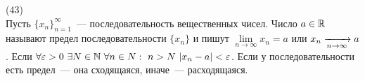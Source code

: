 (43)\\
Пусть $\{x_n\}^{\infty}_{n = 1}$~--- последовательность вещественных чисел. Число $a \in \mathbb{R}$ называют предел последовательности $\{x_n\}$ и пишут $\lim\limits_{n\to \infty} x_n = a$ или $x_n \xrightarrow[n \to \infty]{} a$. Если $\forall \varepsilon > 0\ \exists N \in \N\ \forall n \in N:\ n > N\ |x_n - a| < \varepsilon$. Если у последовательности есть предел~--- она сходящаяся, иначе~--- расходящаяся.